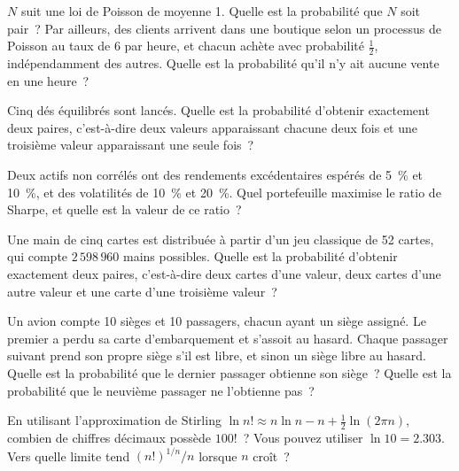 
\begin{question}\label{iq:iv1:timed-test-9:7}
$N$ suit une loi de Poisson de moyenne 1. Quelle est la probabilité que $N$ soit pair~? Par ailleurs, des clients arrivent dans une boutique selon un processus de Poisson au taux de 6 par heure, et chacun achète avec probabilité $\frac12$, indépendamment des autres. Quelle est la probabilité qu'il n'y ait aucune vente en une heure~?
\end{question}

\begin{question}\label{iq:iv1:timed-test-9:8}
Cinq dés équilibrés sont lancés. Quelle est la probabilité d'obtenir exactement deux paires, c'est-à-dire deux valeurs apparaissant chacune deux fois et une troisième valeur apparaissant une seule fois~?
\end{question}

\begin{question}\label{iq:iv1:timed-test-9:9}
Deux actifs non corrélés ont des rendements excédentaires espérés de 5~\% et 10~\%, et des volatilités de 10~\% et 20~\%. Quel portefeuille maximise le ratio de Sharpe, et quelle est la valeur de ce ratio~?
\end{question}

\begin{question}\label{iq:iv1:timed-test-9:10}
Une main de cinq cartes est distribuée à partir d'un jeu classique de 52 cartes, qui compte $2\,598\,960$ mains possibles. Quelle est la probabilité d'obtenir exactement deux paires, c'est-à-dire deux cartes d'une valeur, deux cartes d'une autre valeur et une carte d'une troisième valeur~?
\end{question}

\begin{question}\label{iq:iv1:timed-test-9:11}
Un avion compte 10 sièges et 10 passagers, chacun ayant un siège assigné. Le premier a perdu sa carte d'embarquement et s'assoit au hasard. Chaque passager suivant prend son propre siège s'il est libre, et sinon un siège libre au hasard. Quelle est la probabilité que le dernier passager obtienne son siège~? Quelle est la probabilité que le neuvième passager ne l'obtienne pas~?
\end{question}

\begin{question}\label{iq:iv1:timed-test-9:12}
En utilisant l'approximation de Stirling $\ln n! \approx n\ln n - n + \frac12\ln(2\pi n)$, combien de chiffres décimaux possède $100!$~? Vous pouvez utiliser $\ln 10 = 2.303$. Vers quelle limite tend $(n!)^{1/n}/n$ lorsque $n$ croît~?
\end{question}
